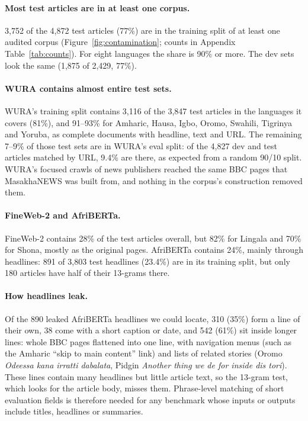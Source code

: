\documentclass[11pt]{article}
\newcommand{\om}[1]{\textit{#1}}
\begin{document}
\paragraph{Most test articles are in at least one corpus.} 3,752 of the 4,872 test articles (77\%) are in the training split of at least one audited corpus (Figure~\ref{fig:contamination}; counts in Appendix Table~\ref{tab:counts}). For eight languages the share is 90\% or more. The dev sets look the same (1,875 of 2,429, 77\%).

\paragraph{WURA contains almost entire test sets.} WURA's training split contains 3,116 of the 3,847 test articles in the languages it covers (81\%), and 91--93\% for Amharic, Hausa, Igbo, Oromo, Swahili, Tigrinya and Yoruba, as complete documents with headline, text and URL. The remaining 7--9\% of those test sets are in WURA's eval split: of the 4,827 dev and test articles matched by URL, 9.4\% are there, as expected from a random 90/10 split. WURA's focused crawls of news publishers \citep{oladipo2023wura} reached the same BBC pages that MasakhaNEWS was built from, and nothing in the corpus's construction removed them.

\paragraph{FineWeb-2 and AfriBERTa.} FineWeb-2 contains 28\% of the test articles overall, but 82\% for Lingala and 70\% for Shona, mostly as the original pages. AfriBERTa contains 24\%, mainly through headlines: 891 of 3,803 test headlines (23.4\%) are in its training split, but only 180 articles have half of their 13-grams there.

\paragraph{How headlines leak.} Of the 890 leaked AfriBERTa headlines we could locate, 310 (35\%) form a line of their own, 38 come with a short caption or date, and 542 (61\%) sit inside longer lines: whole BBC pages flattened into one line, with navigation menus (such as the Amharic ``skip to main content'' link) and lists of related stories (Oromo \om{Odeessa kana irratti dabalata}, Pidgin \om{Another thing we de for inside dis tori}). These lines contain many headlines but little article text, so the 13-gram test, which looks for the article body, misses them. Phrase-level matching of short evaluation fields is therefore needed for any benchmark whose inputs or outputs include titles, headlines or summaries.
\end{document}
